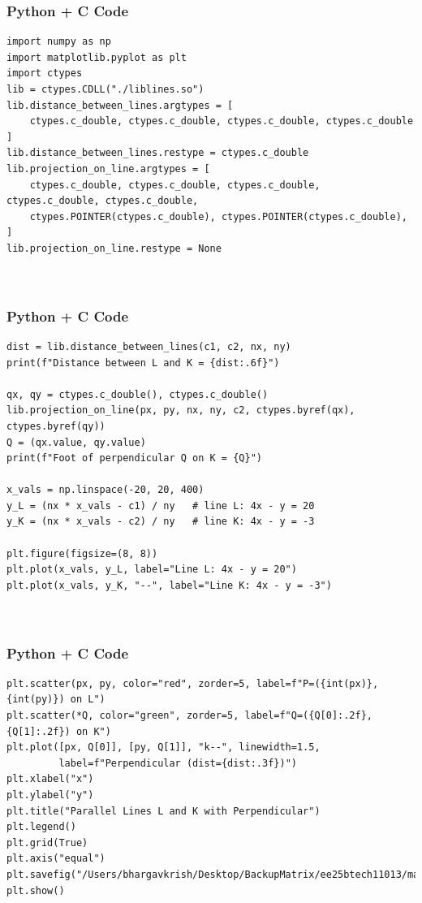 \documentclass{beamer}
\begin{document}
\begin{frame}[fragile]
    \frametitle{Python + C Code}
    \begin{lstlisting}
import numpy as np
import matplotlib.pyplot as plt
import ctypes
lib = ctypes.CDLL("./liblines.so")
lib.distance_between_lines.argtypes = [
    ctypes.c_double, ctypes.c_double, ctypes.c_double, ctypes.c_double
]
lib.distance_between_lines.restype = ctypes.c_double
lib.projection_on_line.argtypes = [
    ctypes.c_double, ctypes.c_double, ctypes.c_double, ctypes.c_double, ctypes.c_double,
    ctypes.POINTER(ctypes.c_double), ctypes.POINTER(ctypes.c_double),
]
lib.projection_on_line.restype = None



    \end{lstlisting}
\end{frame}


\begin{frame}[fragile]
    \frametitle{Python + C Code}
    \begin{lstlisting}
dist = lib.distance_between_lines(c1, c2, nx, ny)
print(f"Distance between L and K = {dist:.6f}")

qx, qy = ctypes.c_double(), ctypes.c_double()
lib.projection_on_line(px, py, nx, ny, c2, ctypes.byref(qx), ctypes.byref(qy))
Q = (qx.value, qy.value)
print(f"Foot of perpendicular Q on K = {Q}")

x_vals = np.linspace(-20, 20, 400)
y_L = (nx * x_vals - c1) / ny   # line L: 4x - y = 20
y_K = (nx * x_vals - c2) / ny   # line K: 4x - y = -3

plt.figure(figsize=(8, 8))
plt.plot(x_vals, y_L, label="Line L: 4x - y = 20")
plt.plot(x_vals, y_K, "--", label="Line K: 4x - y = -3")



    \end{lstlisting}
\end{frame}


\begin{frame}[fragile]
    \frametitle{Python + C Code}
    \begin{lstlisting}
plt.scatter(px, py, color="red", zorder=5, label=f"P=({int(px)},{int(py)}) on L")
plt.scatter(*Q, color="green", zorder=5, label=f"Q=({Q[0]:.2f},{Q[1]:.2f}) on K")
plt.plot([px, Q[0]], [py, Q[1]], "k--", linewidth=1.5,
         label=f"Perpendicular (dist={dist:.3f})")
plt.xlabel("x")
plt.ylabel("y")
plt.title("Parallel Lines L and K with Perpendicular")
plt.legend()
plt.grid(True)
plt.axis("equal")
plt.savefig("/Users/bhargavkrish/Desktop/BackupMatrix/ee25btech11013/matgeo/4.13.18/figs/Figure_1.png")
plt.show()

    \end{lstlisting}
\end{frame}
\end{document}
